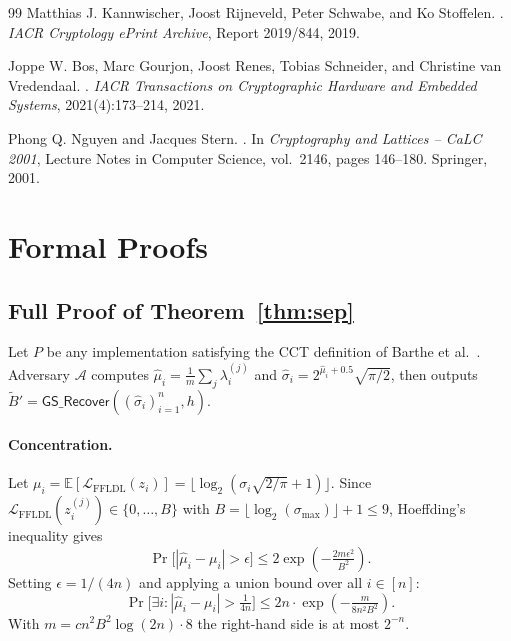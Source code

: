 \documentclass[sigconf,anonymous]{acmart}
\begin{document}
\begin{thebibliography}{99}
Matthias J. Kannwischer, Joost Rijneveld, Peter Schwabe, and Ko Stoffelen.
.
\newblock \emph{IACR Cryptology ePrint Archive}, Report 2019/844, 2019.

Joppe W. Bos, Marc Gourjon, Joost Renes, Tobias Schneider, and Christine van
  Vredendaal.
.
\newblock \emph{IACR Transactions on Cryptographic Hardware and Embedded
  Systems}, 2021(4):173--214, 2021.

Phong Q. Nguyen and Jacques Stern.
.
\newblock In \emph{Cryptography and Lattices -- CaLC 2001}, Lecture Notes in
  Computer Science, vol.~2146, pages 146--180. Springer, 2001.

\end{thebibliography}

\appendix
\section{Formal Proofs}

\subsection{Full Proof of Theorem~\ref{thm:sep}}

Let $P$ be any implementation satisfying the CCT definition of Barthe et
al.~\cite{barthe2014}.  Adversary $\mathcal{A}$ computes
$\hat{\mu}_i = \frac{1}{m}\sum_j \lambda_i^{(j)}$ and
$\hat{\sigma}_i = 2^{\hat{\mu}_i+0.5}\sqrt{\pi/2}$, then outputs
$\widetilde{B}' = \mathsf{GS\_Recover}((\hat{\sigma}_i)_{i=1}^n, h)$.

\paragraph{Concentration.}
Let $\mu_i = \mathbb{E}[\mathcal{L}_{\mathrm{FFLDL}}(z_i)] =
\lfloor\log_2(\sigma_i\sqrt{2/\pi}+1)\rfloor$.
Since $\mathcal{L}_{\mathrm{FFLDL}}(z_i^{(j)})\in\{0,\ldots,B\}$ with
$B = \lfloor\log_2(\sigma_{\max})\rfloor+1 \le 9$, Hoeffding's inequality
gives
\[
  \Pr\bigl[|\hat{\mu}_i - \mu_i| > \epsilon\bigr]
  \le 2\exp\!\left(-\tfrac{2m\epsilon^2}{B^2}\right).
\]
Setting $\epsilon = 1/(4n)$ and applying a union bound over all $i\in[n]$:
\[
  \Pr\bigl[\exists i: |\hat{\mu}_i-\mu_i| > \tfrac{1}{4n}\bigr]
  \le 2n\cdot\exp\!\left(-\tfrac{m}{8n^2B^2}\right).
\]
With $m = cn^2B^2\log(2n)\cdot 8$ the right-hand side is at most $2^{-n}$.
\end{document}
